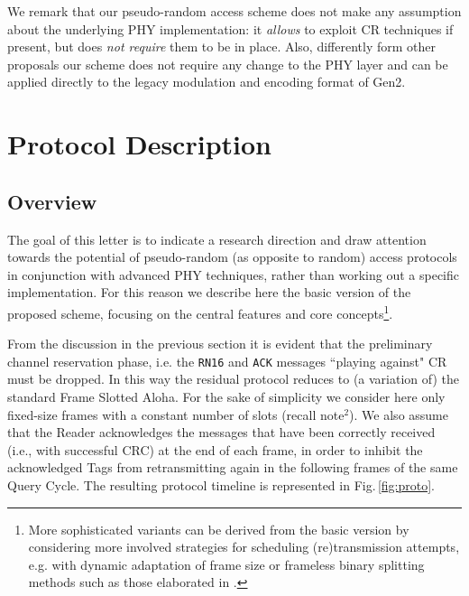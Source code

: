 \documentclass[12pt,draftcls,onecolumn]{IEEEtran}
\begin{document}
We remark that our pseudo-random access scheme  does not make any assumption about the underlying PHY implementation: it \emph{allows} to exploit CR techniques if present,  but does \emph{not require} them to be in place. Also, differently form other proposals \cite{cassini07} our scheme does not require any change to the PHY layer and can be applied directly to the legacy modulation and encoding format of Gen2.











\section{Protocol Description}\label{sec:scenario}
\subsection{Overview}


The goal of this letter is to indicate a research direction and draw attention towards the potential of pseudo-random (as opposite to random) access protocols in conjunction with advanced PHY techniques,  rather than working out a specific implementation.  For this reason we describe here the basic version of the proposed scheme, focusing on the central features and core concepts\footnote{
More sophisticated variants can be derived from the basic version by considering more involved strategies for scheduling (re)transmission attempts, e.g. with dynamic adaptation of frame size or frameless binary splitting methods such as those elaborated in \cite{binarytree}.}.

From the discussion in the previous section it is evident that the preliminary channel reservation phase, i.e. the \texttt{RN16} and \texttt{ACK} messages  ``playing against" CR must be dropped. In this way the residual protocol reduces to (a variation of) the standard Frame Slotted Aloha.
For the sake of simplicity  we consider here only fixed-size frames with a constant number of slots (recall note$^2$).
We also assume that the Reader acknowledges the messages that have been correctly received (i.e., with successful CRC) at the end of each frame,
in order to inhibit  the acknowledged Tags from retransmitting again in the following frames of the same Query Cycle.
The resulting protocol timeline is represented in Fig.\,\ref{fig:proto}.
\end{document}
